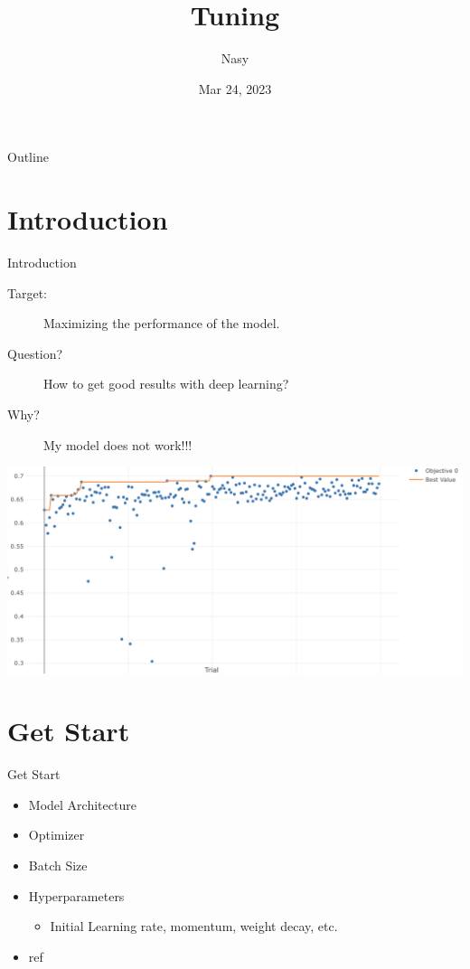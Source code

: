 \documentclass[aspectratio=1610,xcolor={dvipsnames},hyperref={colorlinks,unicode,linkcolor=violet,anchorcolor=BlueViolet,citecolor=YellowOrange,filecolor=black,urlcolor=Aquamarine}]{beamer}
\author{Nasy}
\date{Mar 24, 2023}
\title{Tuning}
\begin{document}
\maketitle
\begin{frame}{Outline}
\tableofcontents
\end{frame}


\section{Introduction}
\label{sec:org88782c5}

\begin{frame}[label={sec:org073d86e}]{Introduction}
\begin{description}
\item[{Target:}] Maximizing the performance of the model.
\item[{Question?}] How to get good results with deep learning?
\item[{Why?}] My model does not work!!!
\end{description}

\begin{center}
\includegraphics[width=.9\linewidth]{./p1.png}
\end{center}
\end{frame}

\section{Get Start}
\label{sec:orgb4da06c}

\begin{frame}[label={sec:org4b36724}]{Get Start}
\begin{itemize}
\item Model Architecture
\item Optimizer
\item Batch Size
\item Hyperparameters
\begin{itemize}
\item Initial Learning rate, momentum, weight decay, etc.
\end{itemize}
\item ref 
\end{itemize}
\end{frame}
\end{document}
